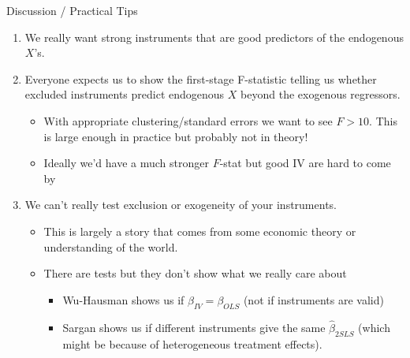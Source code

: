 \documentclass[aspectratio=169,11pt]{beamer}
\begin{document}
\begin{frame}{Discussion / Practical Tips}
\begin{enumerate}
	\item We really want \alert{strong instruments} that are good predictors of the \alert{endogenous} $X$'s.
	\item Everyone expects us to show the \alert{first-stage F-statistic} telling us whether \alert{excluded instruments} predict endogenous $X$ \alert{beyond the exogenous regressors}.
	\begin{itemize}
		\item With appropriate clustering/standard errors we want to see $F>10$. This is \alert{large enough in practice} but probably \alert{not in theory}!
		\item Ideally we'd have a much stronger $F$-stat but good IV are hard to come by
	\end{itemize}
	\item We can't really test \alert{exclusion} or \alert{exogeneity} of your instruments. 
	\begin{itemize}
		\item This is largely a story that comes from some economic theory or understanding of the world. 
	\item There are tests but they don't show what we really care about
	\begin{itemize}
		\item Wu-Hausman shows us if $\beta_{IV} = \beta_{OLS}$ (not if instruments are valid)
		\item Sargan shows us if different instruments give the same $\widehat{\beta}_{2SLS}$ (which might be because of \alert{heterogeneous treatment effects}).
	\end{itemize}
	\end{itemize}
\end{enumerate}
\end{frame}








\end{document}
